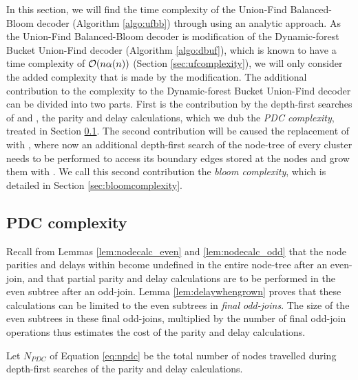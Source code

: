 In this section, we will find the time complexity of the Union-Find Balanced-Bloom decoder (Algorithm \ref{algo:ufbb}) through using an analytic approach. As the Union-Find Balanced-Bloom decoder is modification of the Dynamic-forest Bucket Union-Find decoder (Algorithm \ref{algo:dbuf}), which is known to have a time complexity of $\mathcal{O}(n\alpha(n))$ (Section \ref{sec:ufcomplexity}), we will only consider the added complexity that is made by the modification. The additional contribution to the complexity to the Dynamic-forest Bucket Union-Find decoder can be divided into two parts. First is the contribution by the depth-first searches of  and , the parity and delay calculations, which we dub the \emph{PDC complexity}, treated in Section \ref{sec:pdfcomplexity}. The second contribution will be caused the replacement of  with , where now an additional depth-first search of the node-tree of every cluster needs to be performed to access its boundary edges stored at the nodes and grow them with . We call this second contribution the \emph{bloom complexity}, which is detailed in Section \ref{sec:bloomcomplexity}.

\subsection{PDC complexity}\label{sec:pdfcomplexity}
Recall from Lemmas \ref{lem:nodecalc_even} and \ref{lem:nodecalc_odd} that the node parities and delays within become undefined in the entire node-tree after an even-join, and that partial parity and delay calculations are to be performed in the even subtree after an odd-join. Lemma \ref{lem:delaywhengrown} proves that these calculations can be limited to the even subtrees in \emph{final odd-joins}. The size of the even subtrees in these final odd-joins, multiplied by the number of final odd-join operations thus estimates the cost of the parity and delay calculations. 
\begin{definition}\label{def:npdc}
  Let $N_{PDC}$ of Equation \eqref{eq:npdc} be the total number of nodes travelled during depth-first searches of the parity and delay calculations.
\end{definition}

